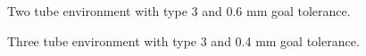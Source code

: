 \begin{figure}
    \caption{Two tube environment with type 3 and 0.6 mm goal tolerance.}
    \label{fig:two-tube-traj}
\end{figure}
\begin{figure}
    \caption{Three tube environment with type 3 and 0.4 mm goal tolerance.}
    \label{fig:three-tube-traj}
\end{figure}
